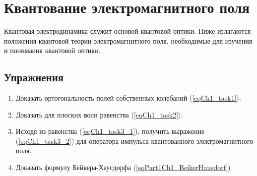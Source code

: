 \chapter{Квантование электромагнитного поля} 

Квантовая электродинамика служит основой квантовой оптики. Ниже
излагаются положения квантовой теории электромагнитного поля,
необходимые для изучения и понимания квантовой оптики.















\section{Упражнения}
\begin{enumerate}
\item Доказать ортогональность полей собственных колебаний
  (\ref{eqCh1_task1}).  
\item Доказать для плоских волн равенства (\ref{eqCh1_task2}).
\item Исходя из равенства (\ref{eqCh1_task3_1}), получить выражение
  (\ref{eqCh1_task3_2}) для оператора импульса квантованного
  электромагнитного поля. 
\item Доказать формулу Бейкера-Хаусдорфа (\ref{eqPart1Ch1_BeikerHausdorf})
\end{enumerate}

